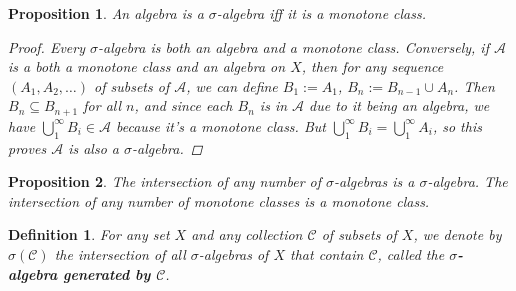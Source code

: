 \documentclass[a4paper,14pt]{article}
\newtheorem*{prop}{Proposition}
\newtheorem*{defn}{Definition}
\begin{document}
\begin{prop}
An algebra is a $\sigma$-algebra iff it is a monotone class.
\begin{proof}
Every $\sigma$-algebra is both an algebra and a monotone class. Conversely, if $\mathcal{A}$ is a both a monotone class and an algebra on $X$, then for any sequence $(A_1, A_2, \ldots)$ of subsets of $\mathcal{A}$, we can define $B_1 := A_1$, $B_n := B_{n-1} \cup A_n$. Then $B_n \subseteq B_{n+1}$ for all $n$, and since each $B_n$ is in $\mathcal{A}$ due to it being an algebra, we have $\bigcup_1^{\infty} B_i \in \mathcal{A}$ because it's a monotone class. But $\bigcup_1^{\infty} B_i = \bigcup_1^{\infty} A_i$, so this proves $\mathcal{A}$ is also a $\sigma$-algebra.
\end{proof}
\end{prop}

\begin{prop}
The intersection of any number of $\sigma$-algebras is a $\sigma$-algebra. The intersection of any number of monotone classes is a monotone class.
\end{prop}

\begin{defn}
For any set $X$ and any collection $\mathcal{C}$ of subsets of $X$, we denote by $\sigma(\mathcal{C})$ the intersection of all $\sigma$-algebras of $X$ that contain $\mathcal{C}$, called the \textbf{$\sigma$-algebra generated by $\mathcal{C}$}.
\end{defn}
\end{document}
